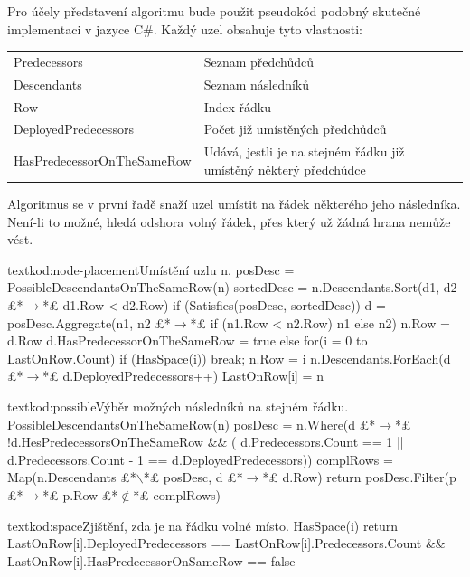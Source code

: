\documentclass[
  biblatex,
  glossaries,
  index
]{kidiplom}
\begin{document}
Pro účely představení algoritmu bude použit pseudokód podobný skutečné implementaci v jazyce C\#. Každý uzel obsahuje tyto vlastnosti:

\begin{table}[H]
\begin{tabular}{@{}ll@{}}
Predecessors               & Seznam předchůdců                                                 \\
Descendants                & Seznam následníků                                                 \\
Row                        & Index řádku
\\
DeployedPredecessors                        & Počet již umístěných předchůdců                                                                                         \\
HasPredecessorOnTheSameRow & Udává, jestli je na stejném řádku již umístěný
 některý předchůdce
\end{tabular}
\end{table}

Algoritmus se v první řadě snaží uzel umístit na řádek některého jeho následníka. Není-li to možné, hledá odshora volný řádek, přes který už žádná hrana nemůže vést.

\begin{kicode}{text}{kod:node-placement}{Umístění uzlu n.}
posDesc = PossibleDescendantsOnTheSameRow(n)
sortedDesc = n.Descendants.Sort(d1, d2  £*$\to$*£ d1.Row < d2.Row)
if (Satisfies(posDesc, sortedDesc))
	d = posDesc.Aggregate(n1, n2   £*$\to$*£ if (n1.Row < n2.Row) n1 else n2)
	n.Row = d.Row
	d.HasPredecessorOnTheSameRow = true
else
	for(i = 0 to LastOnRow.Count)
		if (HasSpace(i))
			break;
	n.Row = i
n.Descendants.ForEach(d £*$\to$*£ d.DeployedPredecessors++)
LastOnRow[i] = n
\end{kicode}

\begin{kicode}{text}{kod:possible}{Výběr možných následníků na stejném řádku.}
PossibleDescendantsOnTheSameRow(n)
	posDesc = n.Where(d £*$\to$*£
		!d.HesPredecessorsOnTheSameRow && (
		d.Predecessors.Count == 1 ||
		d.Predecessors.Count - 1 == d.DeployedPredecessors))
	complRows = Map(n.Descendants £*$\smallsetminus$*£ posDesc, d £*$\!\to\!$*£ d.Row)
	return posDesc.Filter(p £*$\to$*£ p.Row £*$\not\in$*£ complRows)
\end{kicode}

\begin{kicode}{text}{kod:space}{Zjištění, zda je na řádku volné místo.}
HasSpace(i)
	return LastOnRow[i].DeployedPredecessors == 	LastOnRow[i].Predecessors.Count && 	LastOnRow[i].HasPredecessorOnSameRow == false
\end{kicode}
\end{document}
